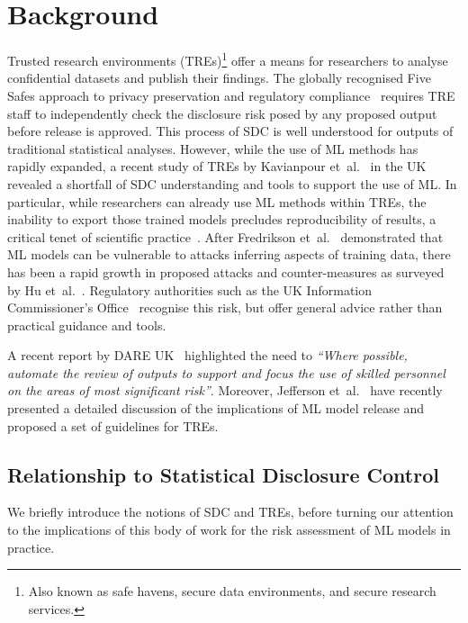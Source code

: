 \section{Background}%
\label{sec:background}

Trusted research environments (TREs)\footnote{Also known as safe havens, secure data environments, and secure research services.} offer a means for researchers to analyse confidential datasets and publish their findings. The globally recognised Five Safes approach to privacy preservation and regulatory compliance~\cite{Green:2023} requires TRE staff to independently check the disclosure risk posed by any proposed output before release is approved. This process of SDC is well understood for outputs of traditional statistical analyses. However, while the use of ML methods has rapidly expanded, a recent study of TREs by Kavianpour et~al.~\cite{Kavianpour:2022} in the UK revealed a shortfall of SDC understanding and tools to support the use of ML\@. In particular, while researchers can already use ML methods within TREs, the inability to export those trained models precludes reproducibility of results, a critical tenet of scientific practice~\cite{Begley:2015, Arnold:2019}. After Fredrikson et~al.~\cite{Fredrikson:2015} demonstrated that ML models can be vulnerable to attacks inferring aspects of training data, there has been a rapid growth in proposed attacks and counter-measures as surveyed by Hu et~al.~\cite{Hu:2022}. Regulatory authorities such as the UK Information Commissioner's Office~\cite{ico:2022} recognise this risk, but offer general advice rather than practical guidance and tools. 

A recent report by DARE UK~\cite{Dare:2022} highlighted the need to \textit{``Where possible, automate the review of outputs to support and focus the use of skilled personnel on the areas of most significant risk''}. Moreover, Jefferson et~al.~\cite{Jefferson:2022} have recently presented a detailed discussion of the implications of ML model release and proposed a set of guidelines for TREs.

\subsection{Relationship to Statistical Disclosure Control}%
\label{sec:structural}

We briefly introduce the notions of SDC and TREs, before turning our attention to the implications of this body of work for the risk assessment of ML models in practice.

